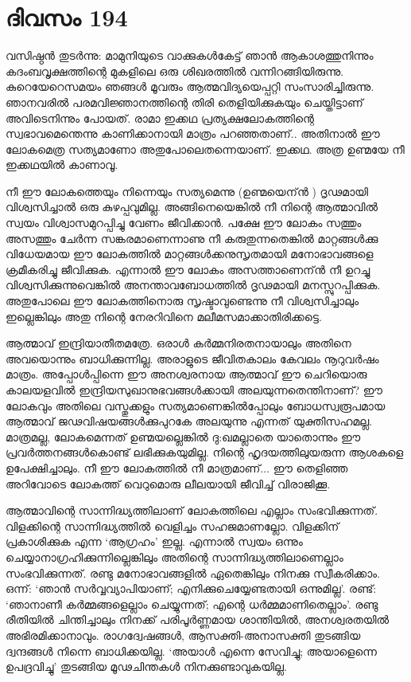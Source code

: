 \section{ദിവസം 194}


വസിഷ്ഠൻ തുടർന്നു: മാമുനിയുടെ വാക്കുകൾകേട്ട് ഞാൻ ആകാശത്തുനിന്നും കദംബവൃക്ഷത്തിന്റെ മുകളിലെ ഒരു ശിഖരത്തില്‍ വന്നിറങ്ങിയിരുന്നു. കുറെയേറെസമയം ഞങ്ങൾ മൂവരും ആത്മവിദ്യയെപ്പറ്റി സംസാരിച്ചിരുന്നു. ഞാനവരിൽ പരമവിജ്ഞാനത്തിന്റെ തിരി തെളിയിക്കുകയും ചെയ്തിട്ടാണ് അവിടെനിന്നും പോയത്. രാമാ ഇക്കഥ പ്രത്യക്ഷലോകത്തിന്റെ സ്വഭാവമെന്തെന്നു കാണിക്കാനായി മാത്രം പറഞ്ഞതാണ്‌.. അതിനാൽ ഈ ലോകമെത്ര സത്യമാണോ അതുപോലെതന്നെയാണ്‌. ഇക്കഥ. അത്ര ഉണ്മയേ നീ ഇക്കഥയില്‍  കാണാവൂ.

നീ ഈ ലോകത്തെയും നിന്നെയും സത്യമെന്നു (ഉണ്മയെന്ന്‍ ) ദൃഢമായി  വിശ്വസിച്ചാൽ ഒരു കുഴപ്പവുമില്ല. അങ്ങിനെയെങ്കില്‍ നീ നിന്റെ ആത്മാവിൽ സ്വയം വിശ്വാസമുറപ്പിച്ചു  വേണം ജീവിക്കാന്‍. പക്ഷേ ഈ ലോകം സത്തും അസത്തും ചേർന്ന സങ്കരമാണെന്നാണു നീ കരുതുന്നതെങ്കിൽ മാറ്റങ്ങൾക്കു വിധേയമായ ഈ ലോകത്തിൽ മാറ്റങ്ങൾക്കനുസൃതമായി മനോഭാവങ്ങളെ ക്രമീകരിച്ചു ജീവിക്കുക. എന്നാൽ ഈ ലോകം അസത്താണെന്ന്‍ നീ ഉറച്ചു വിശ്വസിക്കുന്നുവെങ്കിൽ അനന്താവബോധത്തിൽ ദൃഢമായി മനസ്സുറപ്പിക്കുക. അതുപോലെ ഈ ലോകത്തിനൊരു സൃഷ്ടാവുണ്ടെന്നു നീ വിശ്വസിച്ചാലും ഇല്ലെങ്കിലും അതു നിന്റെ നേരറിവിനെ മലീമസമാക്കാതിരിക്കട്ടെ.

ആത്മാവ് ഇന്ദ്രിയാതീതമത്രേ. ഒരാൾ കർമ്മനിരതനായാലും അതിനെ അവയൊന്നും ബാധിക്കുന്നില്ല. അരാളുടെ ജീവിതകാലം കേവലം നൂറുവർഷം മാത്രം. അപ്പോള്‍പ്പിന്നെ ഈ അനശ്വരനായ ആത്മാവ് ഈ ചെറിയൊരു കാലയളവിൽ ഇന്ദ്രിയസുഖാനുഭവങ്ങൾക്കായി അലയുന്നതെന്തിനാണ്‌? ഈ ലോകവും അതിലെ വസ്തുക്കളും സത്യമാണെങ്കില്‍പ്പോലും ബോധസ്വരൂപമായ ആത്മാവ് ജഢവിഷയങ്ങൾക്കുപുറകേ അലയുന്നു എന്നത് യുക്തിസഹമല്ല. മാത്രമല്ല, ലോകമെന്നത് ഉണ്മയല്ലെങ്കിൽ ദു:ഖമല്ലാതെ യാതൊന്നും ഈ പ്രവർത്തനങ്ങൾകൊണ്ട് ലഭിക്കുകയുമില്ല. നിന്റെ ഹൃദയത്തിലുയരുന്ന ആശകളെ ഉപേക്ഷിച്ചാലും. നീ ഈ ലോകത്തിൽ നീ മാത്രമാണ്‌... ഈ തെളിഞ്ഞ അറിവോടെ ലോകത്ത് വെറുമൊരു ലീലയായി ജീവിച്ച് വിരാജിക്കൂ.

ആത്മാവിന്റെ സാന്നിദ്ധ്യത്തിലാണ്‌ ലോകത്തിലെ എല്ലാം സംഭവിക്കുന്നത്. വിളക്കിന്റെ സാന്നിദ്ധ്യത്തിൽ വെളിച്ചം സഹജമാണല്ലോ. വിളക്കിന്‌ പ്രകാശിക്കുക എന്ന ‘ആഗ്രഹം’ ഇല്ല. എന്നാൽ സ്വയം ഒന്നും ചെയ്യാനാഗ്രഹിക്കുന്നില്ലെങ്കിലും അതിന്റെ സാന്നിദ്ധ്യത്തിലാണെല്ലാം സംഭവിക്കുന്നത്. രണ്ടു മനോഭാവങ്ങളിൽ ഏതെങ്കിലും നിനക്കു സ്വീകരിക്കാം. ഒന്ന്‌: ‘ഞാൻ സർവ്വവ്യാപിയാണ്‌; എനിക്കുചെയ്യേണ്ടതായി ഒന്നുമില്ല’. രണ്ട്: ‘ഞാനാണീ കർമ്മങ്ങളെല്ലാം ചെയ്യുന്നത്; എന്റെ ധർമ്മമാണിതെല്ലാം’. രണ്ടു രീതിയിൽ ചിന്തിച്ചാലും നിനക്ക് പരിപൂർണ്ണമായ ശാന്തിയിൽ, അനശ്വരതയിൽ അഭിരമിക്കാനാവും. രാഗദ്വേഷങ്ങൾ, ആസക്തി-അനാസക്തി തുടങ്ങിയ ദ്വന്ദങ്ങൾ നിന്നെ ബാധിക്കയില്ല. ‘അയാൾ എന്നെ സേവിച്ചു; അയാളെന്നെ ഉപദ്രവിച്ചു’ തുടങ്ങിയ മൂഢചിന്തകൾ നിനക്കുണ്ടാവുകയില്ല.

